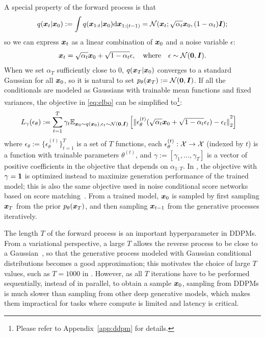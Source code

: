 A special property of the forward process is that 
$$
q({\bm{x}}_t | {\bm{x}}_0) := \int q({\bm{x}}_{1:t} | {\bm{x}}_0) \mathrm{d} {\bm{x}}_{1:(t-1)}= {\mathcal{N}}({\bm{x}}_t; \sqrt{\alpha_t} {\bm{x}}_0, (1 - \alpha_t) {\bm{I}});
$$ 
so we can express ${\bm{x}}_t$ as a linear combination of ${\bm{x}}_0$ and a noise variable $\epsilon$:
\begin{align}
    {\bm{x}}_t = \sqrt{\alpha_t} {\bm{x}}_0 + \sqrt{1 - \alpha_t} \epsilon, \quad \text{where} \quad \epsilon \sim {\mathcal{N}}({\bm{0}}, {\bm{I}}). \label{eq:reparam_xt}
\end{align}
When we set $\alpha_{T}$ sufficiently close to $0$, $q({\bm{x}}_T | {\bm{x}}_0)$ converges to a standard Gaussian for all ${\bm{x}}_0$, so it is natural to set $p_\theta({\bm{x}}_T) := {\mathcal{N}}({\bm{0}}, {\bm{I}})$.
If all the conditionals %
are modeled as Gaussians with trainable mean functions and fixed variances, the objective in \eqref{eq:elbo} can be simplified to\footnote{Please refer to Appendix~\ref{app:ddpm} for details.}:
\begin{align}
    L_\gamma(\epsilon_\theta) & := \sum_{t=1}^{T}\gamma_t{\mathbb{E}}_{{\bm{x}}_0 \sim q({\bm{x}}_0), \epsilon_t \sim {\mathcal{N}}({\bm{0}}, {\bm{I}})}\left[  {\lVert {\epsilon_{\theta}^{(t)}(\sqrt{\alpha_t} {\bm{x}}_0 + \sqrt{1 - \alpha_t} \epsilon_t) - \epsilon_t} \rVert}_2^2 \right] \label{eq:l-gamma}
\end{align}
where $\epsilon_\theta := \{\epsilon_\theta^{(t)}\}_{t=1}^{T}$ is a set of $T$ functions, each $\epsilon_{\theta}^{(t)}: {\mathcal{X}} \to {\mathcal{X}}$ (indexed by $t$) is a function with trainable parameters $\theta^{(t)}$, and $\gamma := [\gamma_1, \ldots, \gamma_T]$ is a vector of positive coefficients in the objective that depends on $\alpha_{1:T}$. 
In \citet{ho2020denoising}, the objective with $\gamma = {\bm{1}}$ is optimized instead to maximize generation performance of the trained model; this is also the same objective used in noise conditional score networks~\citep{song2019generative} based on score matching~\citep{h2005estimation,vincent2011connection}. %
From a trained model, ${\bm{x}}_0$ is sampled by first sampling ${\bm{x}}_T$ from the prior $p_\theta({\bm{x}}_T)$, and then sampling ${\bm{x}}_{t-1}$ from the generative processes iteratively. %


The length $T$ of the forward process is an important hyperparameter in DDPMs.
From a variational perspective, a large $T$ allows the reverse process to be close to a Gaussian~\citep{sohl-dickstein2015deep}, so that the generative process modeled with Gaussian conditional distributions becomes a good approximation; this motivates the choice of large $T$ values, such as $T = 1000$ in \citet{ho2020denoising}. %
However, as all $T$ iterations have to be performed sequentially, instead of in parallel, to obtain a sample ${\bm{x}}_0$, sampling from DDPMs is much slower than sampling from other deep generative models, which makes them impractical for tasks where compute is limited and latency is critical. %
